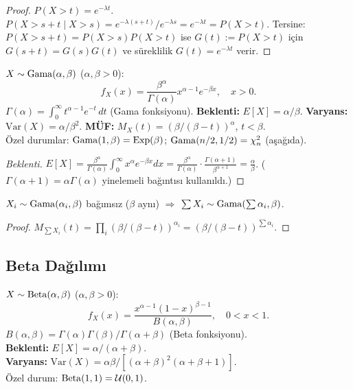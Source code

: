 \begin{proof}
$P(X > t) = e^{-\lambda t}$.
$P(X > s+t \mid X > s) = e^{-\lambda(s+t)}/e^{-\lambda s} = e^{-\lambda t} = P(X > t)$.
Tersine: $P(X > s+t) = P(X > s)P(X > t)$ ise $G(t) := P(X>t)$ için
$G(s+t) = G(s)G(t)$ ve süreklilik $G(t) = e^{-\lambda t}$ verir.
\end{proof}

\begin{tanim}
\label{def:gama}
$X \sim \operatorname{Gama}(\alpha, \beta)$ ($\alpha, \beta > 0$):
\[
  f_X(x) = \frac{\beta^\alpha}{\Gamma(\alpha)} x^{\alpha-1} e^{-\beta x}, \quad x > 0.
\]
$\Gamma(\alpha) = \int_0^\infty t^{\alpha-1} e^{-t} \, dt$ (Gama fonksiyonu).
\textbf{Beklenti:} $E[X] = \alpha/\beta$. \quad
\textbf{Varyans:} $\mathrm{Var}(X) = \alpha/\beta^2$. \quad
\textbf{MÜF:} $M_X(t) = (\beta/(\beta-t))^\alpha$, $t < \beta$.\\
Özel durumlar: $\operatorname{Gama}(1, \beta) = \operatorname{Exp}(\beta)$; $\operatorname{Gama}(n/2, 1/2) = \chi^2_n$ (aşağıda).
\end{tanim}

\begin{proof}[Beklenti]
$E[X] = \frac{\beta^\alpha}{\Gamma(\alpha)} \int_0^\infty x^\alpha e^{-\beta x} dx
= \frac{\beta^\alpha}{\Gamma(\alpha)} \cdot \frac{\Gamma(\alpha+1)}{\beta^{\alpha+1}}
= \frac{\alpha}{\beta}$.
($\Gamma(\alpha+1) = \alpha\Gamma(\alpha)$ yinelemeli bağıntısı kullanıldı.)
\end{proof}

\begin{teorem}
$X_i \sim \operatorname{Gama}(\alpha_i, \beta)$ bağımsız ($\beta$ aynı) $\Rightarrow$
$\sum X_i \sim \operatorname{Gama}(\sum \alpha_i, \beta)$.
\end{teorem}

\begin{proof}
$M_{\sum X_i}(t) = \prod_i (\beta/(\beta-t))^{\alpha_i} = (\beta/(\beta-t))^{\sum\alpha_i}$.
\end{proof}

\subsection{Beta Dağılımı}
\label{subsec:beta}

\begin{tanim}
\label{def:beta}
$X \sim \operatorname{Beta}(\alpha, \beta)$ ($\alpha, \beta > 0$):
\[
  f_X(x) = \frac{x^{\alpha-1}(1-x)^{\beta-1}}{B(\alpha,\beta)}, \quad 0 < x < 1.
\]
$B(\alpha, \beta) = \Gamma(\alpha)\Gamma(\beta)/\Gamma(\alpha+\beta)$ (Beta fonksiyonu).\\
\textbf{Beklenti:} $E[X] = \alpha/(\alpha+\beta)$.\\
\textbf{Varyans:} $\mathrm{Var}(X) = \alpha\beta / [(\alpha+\beta)^2(\alpha+\beta+1)]$.\\
Özel durum: $\operatorname{Beta}(1,1) = \mathcal{U}(0,1)$.
\end{tanim}


